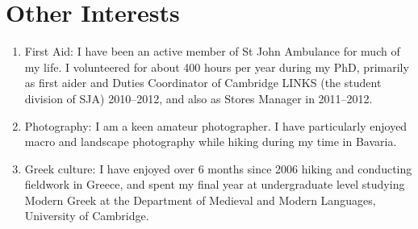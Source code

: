 \documentclass[10pt,a4paper,sans]{templates/moderncv}   %
\begin{document}
\section{Other Interests}
\begin{enumerate}[labelindent=5.2em,leftmargin=*,label=\listitemsymbol]
\item First Aid: I have been an active member of St John Ambulance for much of my life. I volunteered for about 400 hours per year during my PhD, primarily as first aider and Duties Coordinator of Cambridge LINKS (the student division of SJA) 2010--2012, and also as Stores Manager in 2011--2012. 
\item Photography: I am a keen amateur photographer. I have particularly enjoyed macro and landscape photography while hiking during my time in Bavaria.
\item Greek culture: I have enjoyed over 6 months since 2006 hiking and conducting fieldwork in Greece, and spent my final year at undergraduate level studying Modern Greek at the Department of Medieval and Modern Languages, University of Cambridge.
\end{enumerate}

\clearpage
\end{document}
